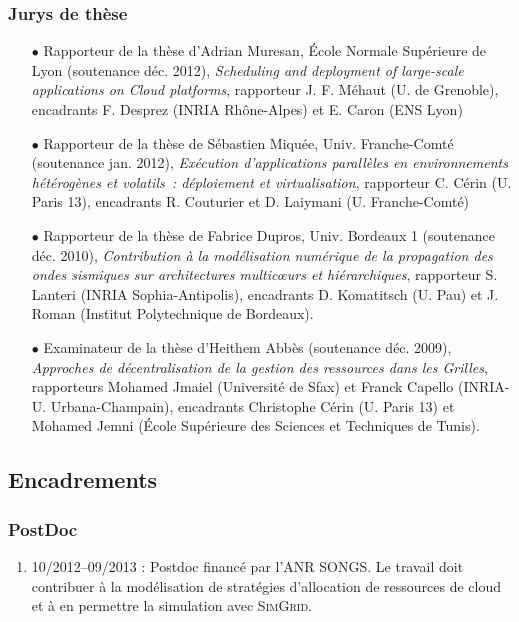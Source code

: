 \documentclass[11pt]{article}
\begin{document}
\subsubsection{Jurys de thèse}

\begin{itemize}

\item[$\bullet$] 
Rapporteur de la thèse d'Adrian Muresan, \'Ecole Normale Supérieure de Lyon
(soutenance déc. 2012), \textit{Scheduling and deployment of large-scale applications on 
Cloud platforms},
rapporteur J. F. Méhaut (U. de Grenoble), 
encadrants F. Desprez (INRIA Rhône-Alpes) et E. Caron (ENS Lyon)\\
\item[$\bullet$] 
Rapporteur de la thèse de Sébastien Miquée, Univ. Franche-Comté (soutenance 
jan. 2012), \textit{Exécution d'applications parallèles en environnements 
hétérogènes et volatils~: déploiement et virtualisation},
rapporteur C. Cérin (U. Paris 13), 
encadrants R. Couturier et D. Laiymani (U. Franche-Comté)\\
\item[$\bullet$] 
Rapporteur de la thèse de Fabrice Dupros, Univ. Bordeaux 1 (soutenance déc. 2010), 
\textit{Contribution à la modélisation numérique de la propagation des ondes 
sismiques sur architectures multic{\oe}urs et hiérarchiques},
rapporteur S. Lanteri (INRIA Sophia-Antipolis), 
encadrants D. Komatitsch (U. Pau) et J. Roman (Institut Polytechnique de 
Bordeaux).\\

\item[$\bullet$] 
Examinateur de la thèse d'Heithem Abbès (soutenance déc. 2009), 
\textit{Approches de décentralisation de la gestion des ressources dans les 
Grilles}, rapporteurs Mohamed Jmaiel (Université de Sfax) et Franck Capello 
(INRIA-U. Urbana-Champain), encadrants Christophe Cérin (U. Paris 13) et 
Mohamed Jemni (École Supérieure des Sciences et Techniques de Tunis).
\end{itemize}




\subsection{Encadrements}

\subsubsection{PostDoc}
\begin{enumerate}
\item 10/2012--09/2013 : Postdoc financé par l'ANR SONGS. Le travail 
doit contribuer à la modélisation de stratégies d'allocation de ressources 
de cloud et à en permettre la simulation avec \textsc{SimGrid}.\\
\end{enumerate}
\end{document}
